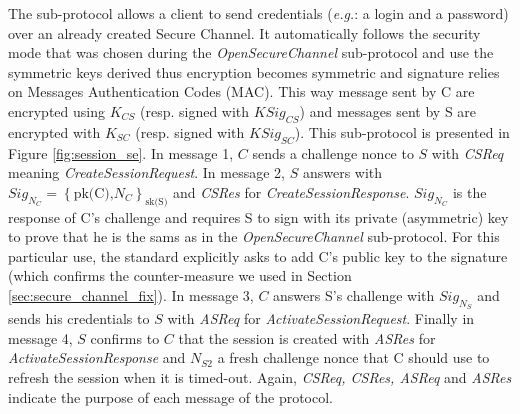 \newcommand{\csreq}{CSReq}
\newcommand{\csres}{CSRes}
\newcommand{\asreq}{ASReq}
\newcommand{\asres}{ASRes}

The  sub-protocol allows a client to send credentials
(\emph{e.g.}: a login and a password) over an already created Secure Channel.
It automatically follows the security mode that was chosen during the
{\em OpenSecureChannel} sub-protocol and use the symmetric keys derived thus
encryption becomes symmetric and signature relies on Messages Authentication
Codes (MAC).
This way message sent by C are encrypted using $K_{CS}$ (resp. signed with
$KSig_{CS}$) and messages sent by S are encrypted with $K_{SC}$ (resp. signed
with $KSig_{SC}$).
This sub-protocol is presented in Figure \ref{fig:session_se}.
In message 1, $C$ sends a challenge nonce to $S$ with {\em CSReq} meaning
{\em CreateSessionRequest}.
In message 2, $S$ answers with $Sig_{N_{C}} = \left\{\mbox{pk(C),
$N_{C}$}\right\}_{\mbox{sk(S)}}$ and {\em CSRes} for
{\em CreateSessionResponse}.
$Sig_{N_{C}}$ is the response of C's challenge and requires S to sign with its
private (asymmetric) key to prove that he is the sams as in the
{\em OpenSecureChannel} sub-protocol.
For this particular use, the \opcua standard explicitly asks to add C's public
key to the signature (which confirms the counter-measure we used in Section
\ref{sec:secure_channel_fix}).
In message 3, $C$ answers S's challenge with $Sig_{N_{S}}$ and sends his
credentials to $S$ with {\em ASReq} for {\em ActivateSessionRequest}.
Finally in message 4, $S$ confirms to $C$ that the session is created with 
{\em ASRes} for {\em ActivateSessionResponse} and $N_{S2}$ a fresh challenge
nonce that C should use to refresh the session when it is timed-out.
Again, {\em CSReq, CSRes, ASReq} and {\em ASRes} indicate the purpose of each
message of the protocol.

